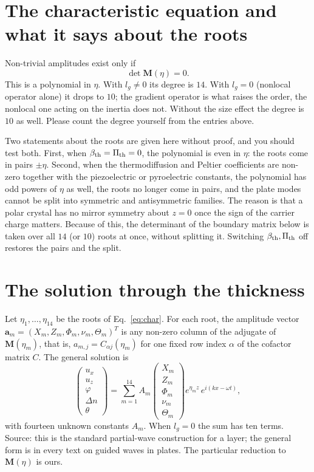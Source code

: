 \documentclass[11pt]{article}
\begin{document}
\section{The characteristic equation and what it says about the roots}

Non-trivial amplitudes exist only if
\begin{equation}
\det\mathbf M(\eta)=0 .
\label{eq:char}
\end{equation}
This is a polynomial in $\eta$. With $l_g\neq0$ its degree is $14$. With $l_g=0$ (nonlocal operator alone)
it drops to $10$; the gradient operator is what raises the order, the nonlocal one acting on the inertia does not.
Without the size effect the degree is $10$ as well. Please count the degree yourself from the entries above.

Two statements about the roots are given here without proof, and you should test both.
First, when $\beta_{\rm th}=\Pi_{\rm th}=0$, the polynomial is even in $\eta$: the roots come in pairs $\pm\eta$.
Second, when the thermodiffusion and Peltier coefficients are non-zero together with the piezoelectric or
pyroelectric constants, the polynomial has odd powers of $\eta$ as well, the roots no longer come in pairs, and
the plate modes cannot be split into symmetric and antisymmetric families. The reason is that a polar crystal
has no mirror symmetry about $z=0$ once the sign of the carrier charge matters. Because of this, the
determinant of the boundary matrix below is taken over all $14$ (or $10$) roots at once, without splitting it.
Switching $\beta_{\rm th},\Pi_{\rm th}$ off restores the pairs and the split.

\section{The solution through the thickness}

Let $\eta_1,\dots,\eta_{14}$ be the roots of Eq.~\eqref{eq:char}. For each root, the amplitude vector
$\mathbf a_m=(X_m,Z_m,\Phi_m,\nu_m,\Theta_m)^T$ is any non-zero column of the adjugate of
$\mathbf M(\eta_m)$, that is, $a_{m,j}=C_{\alpha j}(\eta_m)$ for one fixed row index $\alpha$ of the cofactor matrix
$C$. The general solution is
\begin{equation}
\begin{pmatrix}u_x\\u_z\\\varphi\\\Delta n\\\theta\end{pmatrix}
=\sum_{m=1}^{14}A_m\begin{pmatrix}X_m\\Z_m\\\Phi_m\\\nu_m\\\Theta_m\end{pmatrix}
e^{\eta_mz}\,e^{i(kx-\omega t)} ,
\label{eq:solution}
\end{equation}
with fourteen unknown constants $A_m$. When $l_g=0$ the sum has ten terms. Source: this is the standard
partial-wave construction for a layer; the general form is in every text on guided waves in plates. The
particular reduction to $\mathbf M(\eta)$ is ours.
\end{document}
